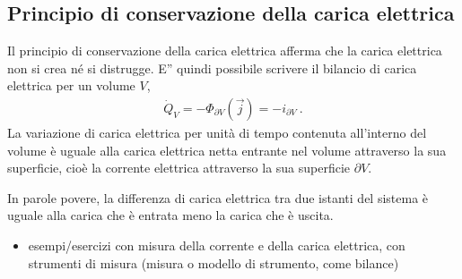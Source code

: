 \documentclass[letterpaper,10pt,italian]{jupyterBook}
\begin{document}
\subsection{Principio di conservazione della carica elettrica}
\label{\detokenize{ch/electromagnetism/electric-current:principio-di-conservazione-della-carica-elettrica}}\label{\detokenize{ch/electromagnetism/electric-current:physics-hs-electromagnetism-charge-conservation}}
\sphinxAtStartPar
Il principio di conservazione della carica elettrica afferma che la carica elettrica non si crea né si distrugge. E” quindi possibile scrivere il bilancio di carica elettrica per un volume \(V\),
\begin{equation}\label{equation:ch/electromagnetism/electric-current:eq:current:charge-equation}
\begin{split}\dot{Q}_V = - \Phi_{\partial V}(\vec{j}) = - i_{\partial V} \ .\end{split}
\end{equation}
\sphinxAtStartPar
La variazione di carica elettrica per unità di tempo contenuta all’interno del volume è uguale alla carica elettrica netta entrante nel volume attraverso la sua superficie, cioè la corrente elettrica attraverso la sua superficie \(\partial V\).

\sphinxAtStartPar
In parole povere, la differenza di carica elettrica tra due istanti del sistema è uguale alla carica che è entrata meno la carica che è uscita.
\begin{itemize}
\item {} 
\sphinxAtStartPar
{} esempi/esercizi con misura della corrente e della carica elettrica, con strumenti di misura (misura o modello di strumento, come bilance)

\end{itemize}
\end{document}
